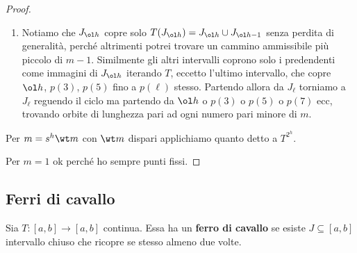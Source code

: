 \begin{proof}
\begin{enumerate}
\item Notiamo che $J_{\ol h}$ copre solo $T(J_{\ol h})=J_{\ol h}\cup J_{\ol h-1}$ senza perdita di generalit\`a, perch\'e altrimenti potrei trovare un cammino ammissibile pi\`u piccolo di $m-1$. Similmente gli altri intervalli coprono solo i predendenti come immagini di $J_{\ol h}$ iterando $T$, eccetto l'ultimo intervallo, che copre $\ol h$, $p(3)$, $p(5)$ fino a $p(\ell)$ stesso. Partendo allora da $J_\ell$ torniamo a $J_\ell$ reguendo il ciclo ma partendo da $\ol h$ o $p(3)$ o $p(5)$ o $p(7)$ ecc, trovando orbite di lunghezza pari ad ogni numero pari minore di $m$.
\end{enumerate}
Per $m=s^h\wt m$ con $\wt m$ dispari applichiamo quanto detto a $T^{2^h}$.

Per $m=1$ ok perch\'e ho sempre punti fissi.
\setlength{\leftmargini}{0.5cm}
\end{proof}

\subsection{Ferri di cavallo}
\begin{definition}
Sia $T:[a,b]\to[a,b]$ continua. Essa ha un \textbf{ferro di cavallo} se esiste $J\subseteq [a,b]$ intervallo chiuso che ricopre se stesso almeno due volte.
\end{definition}

